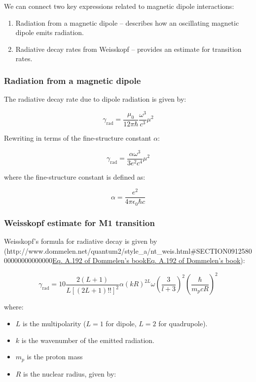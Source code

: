 \documentclass[
]{article}
\let\oldhref\href
\renewcommand{\href}[2]{\ifx#1\urlprefix\oldhref{#1}{#2}\else\uline{\oldhref{#1}{#2}}\fi}
\renewcommand{\[}{\begin{equation}}
\renewcommand{\]}{\end{equation}}
\providecommand{\tightlist}{%
  \setlength{\itemsep}{0pt}\setlength{\parskip}{0pt}}
\begin{document}
We can connect two key expressions related to magnetic dipole
interactions:

\begin{enumerate}
\def\labelenumi{\arabic{enumi}.}
\tightlist
\item
  Radiation from a magnetic dipole -- describes how an oscillating
  magnetic dipole emits radiation.\\
\item
  Radiative decay rates from Weisskopf -- provides an estimate for
  transition rates.
\end{enumerate}

\subsubsection{Radiation from a magnetic
dipole}\label{radiation-from-a-magnetic-dipole}

The radiative decay rate due to dipole radiation is given by:

\[
\gamma_{\text{rad}} = \frac{\mu_0}{12 \pi \hbar} \frac{\omega^3}{c^3} \mu^2
\]

Rewriting in terms of the fine-structure constant \(\alpha\):

\[
\gamma_{\text{rad}} = \frac{\alpha \omega^3}{3 e^2 c^4} \mu^2
\]

where the fine-structure constant is defined as:

\[
\alpha = \frac{e^2}{4\pi \epsilon_0 \hbar c}
\]

\subsubsection{Weisskopf estimate for M1
transition}\label{weisskopf-estimate-for-m1-transition}

Weisskopf's formula for radiative decay is given by
(\href{http://www.dommelen.net/quantum2/style_a/nt_weis.html\#SECTION091258000000000000000}{Eq.
A.192 of Dommelen's book}):

\[
\gamma_{\text{rad}}  =  10\frac{2(L+1)}{L [(2L+1)!!]^2} \alpha (kR)^{2L} \omega \left( \frac{3}{l+3} \right)^2 \left( \frac{\hbar}{m_p c R} \right)^2
\]

where:

\begin{itemize}
\tightlist
\item
  \(L\) is the multipolarity (\(L=1\) for dipole, \(L=2\) for
  quadrupole).
\item
  \(k\) is the wavenumber of the emitted radiation.
\item
  \(m_p\) is the proton mass
\item
  \(R\) is the nuclear radius, given by:
\end{itemize}
\end{document}

